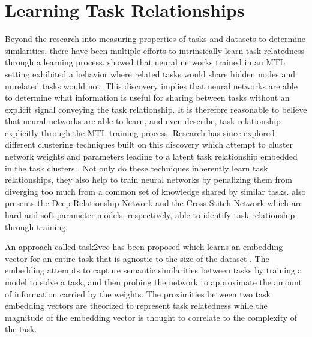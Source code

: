\documentclass[twocolumn]{article}
\begin{document}
\section{Learning Task Relationships}
Beyond the research into measuring properties of tasks and datasets to determine similarities, there have been multiple efforts to intrinsically learn task relatedness through a learning process. \cite{mtl97} showed that neural networks trained in an MTL setting exhibited a behavior where related tasks would share hidden nodes and unrelated tasks would not. This discovery implies that neural networks are able to determine what information is useful for sharing between tasks without an explicit signal conveying the task relationship. It is therefore reasonable to believe that neural networks are able to learn, and even describe, task relationship explicitly through the MTL training process. Research has since explored different clustering techniques built on this discovery which attempt to cluster network weights and parameters leading to a latent task relationship embedded in the task clusters \citep{mtloverview17}. Not only do these techniques inherently learn task relationships, they also help to train neural networks by penalizing them from diverging too much from a common set of knowledge shared by similar tasks. \cite{mtloverview17} also presents the Deep Relationship Network and the Cross-Stitch Network which are hard and soft parameter models, respectively, able to identify task relationship through training.

An approach called task2vec has been proposed which learns an embedding vector for an entire task that is agnostic to the size of the dataset \citep{task2vec19}. The embedding attempts to capture semantic similarities between tasks by training a model to solve a task, and then probing the network to approximate the amount of information carried by the weights. The proximities between two task embedding vectors are theorized to represent task relatedness while the magnitude of the embedding vector is thought to correlate to the complexity of the task.
\end{document}
